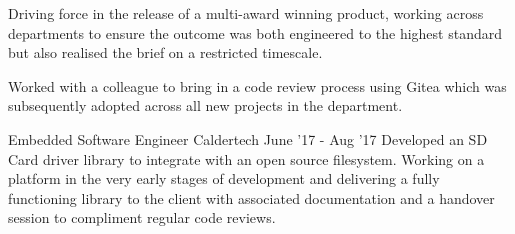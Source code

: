\begin{cventries}
{\begin{cvitems}
        \item{Driving force in the release of a multi-award winning product, working across departments to ensure the outcome was both engineered to the highest standard but also realised the brief on a restricted timescale.}
        \item{Worked with a colleague to bring in a code review process using Gitea which was subsequently adopted across all new projects in the department.}
      \end{cvitems} 
    }

    \cventry
      {Embedded Software Engineer}
      {Caldertech}
      {}
      {June '17 - Aug '17}
      {Developed an SD Card driver library to integrate with an open source filesystem. Working on a platform in the very early stages of development and delivering a fully functioning library to the client with associated documentation and a handover session to compliment regular code reviews.}

\end{cventries}

